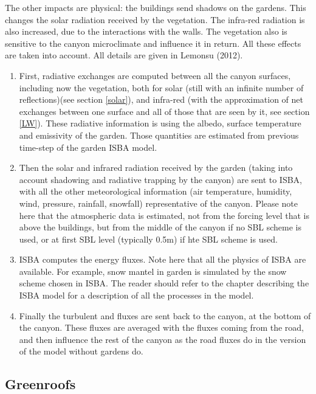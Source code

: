 The other impacts are physical: the buildings send shadows on the gardens. This changes the solar radiation received by the vegetation. The infra-red radiation is also increased, due to the interactions with the walls. The vegetation also is sensitive to the canyon microclimate and influence it in return. All these effects are taken into account.  All details are given in Lemonsu \etal (2012)\nocite{Lemonsu2012}.

\begin{enumerate}
	\item First, radiative exchanges are computed between all the canyon surfaces, including now the vegetation, both for solar (still with an infinite number of reflections)(see section \ref{solar}), and infra-red (with the approximation of net exchanges between one surface and all of those that are seen by it, see section \ref{LW}). These radiative information is using the albedo, surface temperature and emissivity of the garden. Those quantities are estimated from previous time-step of the garden ISBA model. 
	\item Then the solar and infrared radiation received by the garden (taking into account shadowing and radiative trapping by the canyon) are sent to ISBA, with all the other meteorological information (air temperature, humidity, wind, pressure, rainfall, snowfall) representative of the canyon. Please note here that the atmospheric data is estimated, not from the forcing level that is above the buildings, but from the middle of the canyon if no SBL scheme is used, or at first SBL level (typically 0.5m) if hte SBL scheme is used.
\item ISBA computes the energy fluxes. Note here that all the physics of ISBA are available. For example, snow mantel in garden is simulated by the snow scheme chosen in ISBA. The reader should refer to the chapter describing the ISBA model for a description of all the processes in the model.
\item Finally the turbulent and fluxes are sent back to the canyon, at the bottom of the canyon. These fluxes are averaged with the fluxes coming from the road, and then influence the rest of the canyon as the road fluxes do in the version of the model without gardens do.
\end{enumerate}


\subsection{Greenroofs}

